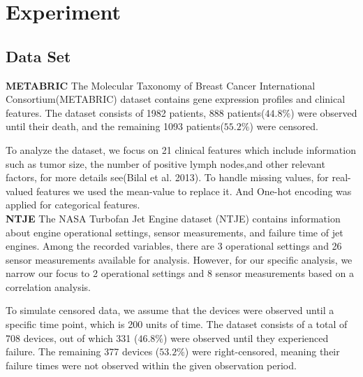 \documentclass[conference]{IEEEconf}
\begin{document}
\section{Experiment}

\subsection{Data Set}

\textbf{METABRIC} The Molecular Taxonomy of Breast Cancer International Consortium(METABRIC) dataset contains gene expression profiles and clinical features. The dataset consists of 1982 patients, 888 patients($44.8\%$) were observed until their death, and the remaining 1093 patients($55.2\%$) were censored.

To analyze the dataset, we focus on 21 clinical features which include information such as tumor size, the number of positive lymph nodes,and other relevant factors, for more details see(Bilal et al. 2013). To handle missing values, for real-valued features we used the mean-value to replace it. And 	One-hot encoding was applied for categorical features.
\\

\textbf{NTJE} The NASA Turbofan Jet Engine dataset (NTJE) contains information about engine operational settings, sensor measurements, and failure time of jet engines. Among the recorded variables, there are 3 operational settings and 26 sensor measurements available for analysis. However, for our specific analysis, we narrow our focus to 2 operational settings and 8 sensor measurements based on a correlation analysis.

To simulate censored data, we assume that the devices were observed until a specific time point, which is 200 units of time. The dataset consists of a total of 708 devices, out of which 331 ($46.8\%$) were observed until they experienced failure. The remaining 377 devices ($53.2\%$) were right-censored, meaning their failure times were not observed within the given observation period.
\end{document}
